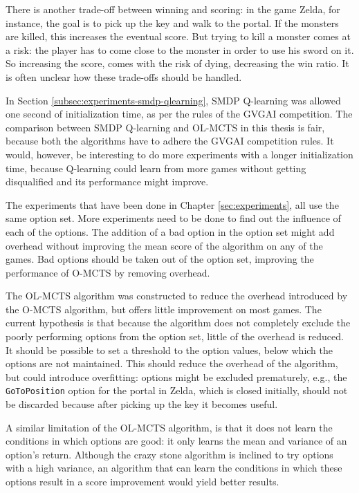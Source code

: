 There is another trade-off between winning and scoring: in the game Zelda, for
instance, the goal is to pick up the key and walk to the portal. If the monsters
are killed, this increases the eventual score. But trying to kill a monster
comes at a risk: the player has to come close to the monster in order to use his
sword on it. So increasing the score, comes with the risk of dying, decreasing
the win ratio. It is often unclear how these trade-offs should be handled.

In Section \ref{subsec:experiments-smdp-qlearning}, SMDP Q-learning was allowed
one second of initialization time, as per the rules of the GVGAI competition.
The comparison between SMDP Q-learning and OL-MCTS in this thesis is fair,
because both the algorithms have to adhere the GVGAI competition rules. It
would, however, be interesting to do more experiments with a longer
initialization time, because Q-learning could learn from more games without
getting disqualified and its performance might improve.

The experiments that have been done in Chapter \ref{sec:experiments}, all use
the same option set. More experiments need to be done to find out the influence
of each of the options. The addition of a bad option in the option set might add
overhead without improving the mean score of the algorithm on any of the games.
Bad options should be taken out of the option set, improving the performance of
O-MCTS by removing overhead.

The OL-MCTS algorithm was constructed to reduce the overhead introduced by the
O-MCTS algorithm, but offers little improvement on most games. The current
hypothesis is that because the algorithm does not completely exclude the poorly
performing options from the option set, little of the overhead is reduced. It
should be possible to set a threshold to the option values, below which the
options are not maintained. This should reduce the overhead of the algorithm,
but could introduce overfitting: options might be excluded prematurely, e.g.,
the \texttt{GoToPosition} option for the portal in Zelda, which is closed
initially, should not be discarded because after picking up the key it becomes
useful. 

A similar limitation of the OL-MCTS algorithm, is that it does not learn the
conditions in which options are good: it only learns the mean and variance of an
option's return. Although the crazy stone algorithm is inclined to try options
with a high variance, an algorithm that can learn the conditions in which these
options result in a score improvement would yield better results.

